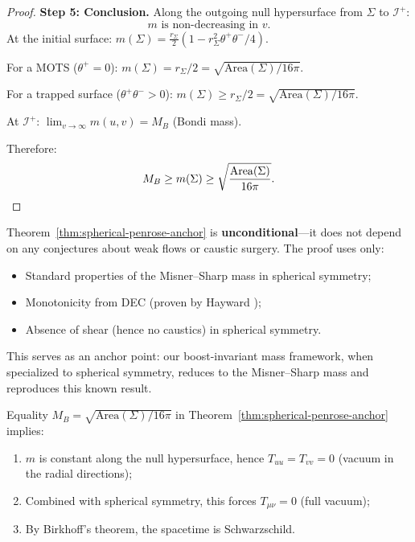 \begin{proof}
\textbf{Step 5: Conclusion.}
Along the outgoing null hypersurface from $\Sigma$ to $\mathscr{I}^+$:
\begin{equation}
m \text{ is non-decreasing in } v.
\end{equation}
At the initial surface: $m(\Sigma) = \frac{r_\Sigma}{2}(1 - r_\Sigma^2 \theta^+ \theta^-/4)$.

For a MOTS ($\theta^+ = 0$): $m(\Sigma) = r_\Sigma/2 = \sqrt{\mathrm{Area}(\Sigma)/16\pi}$.

For a trapped surface ($\theta^+\theta^- > 0$): $m(\Sigma) \geq r_\Sigma/2 = \sqrt{\mathrm{Area}(\Sigma)/16\pi}$.

At $\mathscr{I}^+$: $\lim_{v \to \infty} m(u, v) = M_B$ (Bondi mass).

Therefore:
\begin{equation}
M_B \geq m(\Sigma) \geq \sqrt{\frac{\mathrm{Area}(\Sigma)}{16\pi}}. \qedhere
\end{equation}
\end{proof}

\begin{remark}
Theorem~\ref{thm:spherical-penrose-anchor} is \textbf{unconditional}---it does not depend on any conjectures about weak flows or caustic surgery. The proof uses only:
\begin{itemize}
\item Standard properties of the Misner--Sharp mass in spherical symmetry;
\item Monotonicity from DEC (proven by Hayward \cite{hayward1994});
\item Absence of shear (hence no caustics) in spherical symmetry.
\end{itemize}
This serves as an anchor point: our boost-invariant mass framework, when specialized to spherical symmetry, reduces to the Misner--Sharp mass and reproduces this known result.
\end{remark}

\begin{remark}
Equality $M_B = \sqrt{\mathrm{Area}(\Sigma)/16\pi}$ in Theorem~\ref{thm:spherical-penrose-anchor} implies:
\begin{enumerate}[label=(\roman*)]
\item $m$ is constant along the null hypersurface, hence $T_{uu} = T_{vv} = 0$ (vacuum in the radial directions);
\item Combined with spherical symmetry, this forces $T_{\mu\nu} = 0$ (full vacuum);
\item By Birkhoff's theorem, the spacetime is Schwarzschild.
\end{enumerate}
\end{remark}



